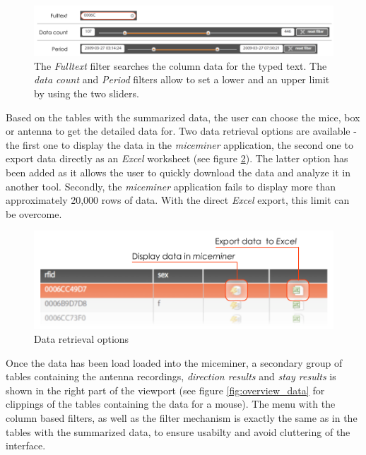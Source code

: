\begin{figure}[htpb]
\begin{center}
  \includegraphics[width=\textwidth]{assets/pdf/filter_types.pdf}
  \caption[Filter types]{The \textit{Fulltext} filter searches the column data for the typed text. The \textit{data count} and \textit{Period} filters allow to set a lower and an upper limit by using the two sliders.}
  \label{fig:filter_types}
\end{center}
\end{figure}

Based on the tables with the summarized data, the user can choose the mice, box or antenna to get the detailed data for. Two data retrieval options are available - the first one to display the data in the \textit{miceminer} application, the second one to export data directly as an \textit{Excel} worksheet (see figure \ref{fig:get_data_options}). The latter option has been added as it allows the user to quickly download the data and analyze it in another tool. Secondly, the \textit{miceminer} application fails to display more than approximately 20,000 rows of data. With the direct \textit{Excel} export, this limit can be overcome.   

\begin{figure}[htpb]
\begin{center}
  \includegraphics[width=.75\textwidth]{assets/pdf/get_data_options.pdf}
  \caption{Data retrieval options}
  \label{fig:get_data_options}
\end{center}
\end{figure}

Once the data has been load loaded into the miceminer, a secondary group of tables containing the antenna recordings, \textit{direction results} and \textit{stay results} is shown in the right part of the viewport (see figure \ref{fig:overview_data} for clippings of the tables containing the data for a mouse). The menu with the column based filters, as well as the filter mechanism is exactly the same as in the tables with the summarized data, to ensure usabilty and avoid cluttering of the interface. 

